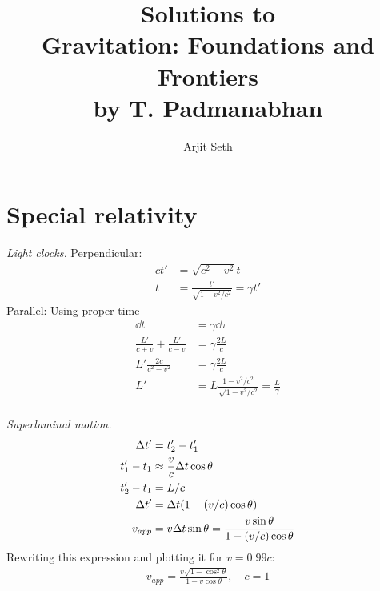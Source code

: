 \documentclass{report}
\begin{document}
\title{Solutions to \\ Gravitation: Foundations and Frontiers \\ by T. Padmanabhan}

\author{Arjit Seth}
\date{}

\maketitle

\chapter{Special relativity}

\begin{subquests}
	\item \emph{Light clocks.}
	Perpendicular:
	\begin{align*}
		ct' & = \sqrt{c^2 - v^2}t \\
		t & = \frac{t'}{\sqrt{1 - v^2/c^2}} = \gamma t'
	\end{align*}
	Parallel: Using proper time -
	\begin{align*}
		\dd{t} & = \gamma\dd{\tau} \\ 
		\frac{L'}{c+v} + \frac{L'}{c-v}  & = \gamma\frac{2L}{c} \\
		L'\frac{2c}{c^2 - v^2} & = \gamma\frac{2L}{c} \\
		L' & = L \frac{1-v^2/c^2}{\sqrt{1-v^2/c^2}} = \frac{L}{\gamma} \\
	\end{align*}

	\item \emph{Superluminal motion.}
	\begin{align*}
		\Delta t' & = t_2' - t_1' \\
		t_1' - t_1 & \approx \frac{v}{c}\Delta t \cos\theta \\
		t_2' - t_1 & = L/c \\
		\Delta t' & = \Delta t\pqty{1-(v/c)\cos\theta} \\
		v_{app} & = v\Delta t \sin\theta = \frac{v\sin\theta}{1-(v/c)\cos\theta}
	\end{align*}
	Rewriting this expression and plotting it for $v = 0.99 c$:
	\begin{align*}
		v_{app} = \frac{v\sqrt{1 - \cos^2 \theta}}{1-v\cos\theta}, \quad c = 1
	\end{align*}


\end{subquests}
\end{document}

